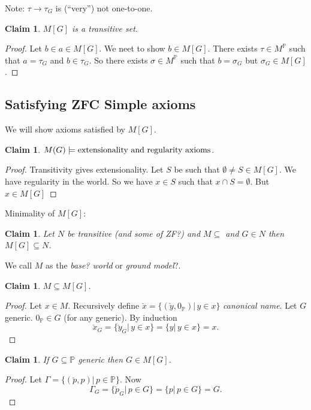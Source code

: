 \documentclass[11pt,pdftex,twoside,a4paper]{article}
\newcommand{\dsP}{\ensuremath{\mathds{P}}}
\newtheorem{claim}[thm]{Claim}
\theoremstyle{definition}
\begin{document}
Note: \(\tau \to \tau_G\) is (``very'') not one-to-one.

\begin{claim}
\(M[G]\) is a transitive set.
\end{claim}
\begin{proof}
Let \(b\in a\in M[G]\). We neet to show \(b\in M[G]\).
There exists \(\tau \in M^\dsP\) such that \(a = \tau_G\)
and \(b\in\tau_G\). So there exists \(\sigma\in M^\dsP\)
such that \(b=\sigma_G\) but \(\sigma_G\in M[G]\).
\end{proof}

\subsection{Satisfying ZFC Simple axioms}

We will show axioms satisfied by \(M[G]\).

\begin{claim}
\(M(G)\models \textnormal{extensionality and regularity axioms}\).
\end{claim}
\begin{proof}
Transitivity gives extensionality.
Let $S$ be such that \(\emptyset\neq S \in M[G]\).
We have regularity in the world. So we have \(x\in S\) such that
\(x\cap S=\emptyset\). But \(x\in M[G]\)
\end{proof}

Minimality of \(M[G]\):
\begin{claim}
Let $N$ be transitive (and some of ZF?)
and \(M\subseteq \) and \(G\in N\)
then \(M[G]\subseteq N\).
\end{claim}

We call $M$ as the \emph{base? world} or \emph{ground model}?.
\begin{claim}
\(M \subseteq M[G]\).
\end{claim}
\begin{proof}
Let \(x\in M\).
Recursively define \(\breve{x} = \{(\breve{y},0_\dsP)|\,y\in x\}\)
\emph{canonical name}.
Let $G$ generic.
\(0_\dsP\in G\) (for any generic). By induction
\begin{equation*}
\breve{x}_G = \{\breve{y}_G|\, y\in x\} = \{y|\, y\in x\} = x.
\end{equation*}
\end{proof}

\begin{claim}
If \(G\subseteq \dsP\) generic then \(G\in M[G]\).
\end{claim}
\begin{proof}
Let \(\Gamma = \{(\breve{p},p)|\,p\in\dsP\}\).
Now
\begin{equation*}
\Gamma_G = \{\breve{p}_G|\, p\in G\} = \{p|\, p\in G\} = G.
\end{equation*}
\end{proof}
\end{document}
